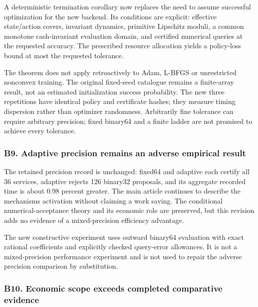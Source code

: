 \documentclass[ecta,nameyear,draft]{econsocart}
\begin{document}
A deterministic termination corollary now replaces the need to assume
successful optimization for the new backend. Its conditions are
explicit: effective state/action covers, invariant dynamics, primitive
Lipschitz moduli, a common monotone cash-invariant evaluation domain,
and certified numerical queries at the requested accuracy. The
prescribed resource allocation yields a policy-loss bound at most the
requested tolerance.

The theorem does not apply retroactively to Adam, L-BFGS or unrestricted
nonconvex training. The original fixed-seed catalogue remains a
finite-array result, not an estimated initialization success
probability. The new three repetitions have identical policy and
certificate hashes; they measure timing dispersion rather than optimizer
randomness. Arbitrarily fine tolerance can require arbitrary precision;
fixed binary64 and a finite ladder are not promised to achieve every
tolerance.

\hypertarget{b9-adaptive-precision-remains-an-adverse-empirical-result}{%
\subsubsection{B9. Adaptive precision remains an adverse empirical
result}\label{b9-adaptive-precision-remains-an-adverse-empirical-result}}

The retained precision record is unchanged: fixed64 and adaptive each
certify all 36 services, adaptive rejects 126 binary32 proposals, and
its aggregate recorded time is about 0.98 percent greater. The main
article continues to describe the mechanism\textquotesingle s activation
without claiming a work saving. The conditional numerical-acceptance
theory and its economic role are preserved, but this revision adds no
evidence of a mixed-precision efficiency advantage.

The new constructive experiment uses outward binary64 evaluation with
exact rational coefficients and explicitly checked query-error
allowances. It is not a mixed-precision performance experiment and is
not used to repair the adverse precision comparison by substitution.

\hypertarget{b10-economic-scope-exceeds-completed-comparative-evidence}{%
\subsubsection{B10. Economic scope exceeds completed comparative
evidence}\label{b10-economic-scope-exceeds-completed-comparative-evidence}}
\end{document}
